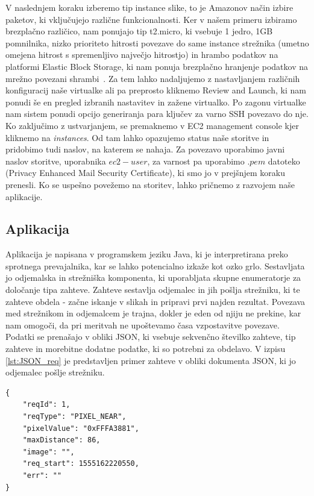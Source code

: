 V naslednjem koraku izberemo tip instance slike, to je Amazonov način izbire paketov, ki vključujejo različne funkcionalnosti. Ker v našem primeru izbiramo brezplačno različico, nam ponujajo tip t2.micro, ki vsebuje 1 jedro, 1GB pomnilnika, nizko prioriteto hitrosti povezave do same instance strežnika (umetno omejena hitrost s spremenljivo največjo hitrostjo) in hrambo podatkov na platformi Elastic Block Storage, ki nam ponuja brezplačno hranjenje podatkov na mrežno povezani shrambi~\cite{1_aws_amazon_ebs}. Za tem lahko nadaljujemo z nastavljanjem različnih konfiguracij naše virtualke ali pa preprosto kliknemo Review and Launch, ki nam ponudi še en pregled izbranih nastavitev in zažene virtualko. Po zagonu virtualke nam sistem ponudi opcijo generiranja para ključev za varno SSH povezavo do nje. Ko zaključimo z ustvarjanjem, se premaknemo v EC2 management console kjer kliknemo na \emph{instances}. Od tam lahko opazujemo status naše storitve in pridobimo tudi naslov, na katerem se nahaja. Za povezavo uporabimo javni naslov storitve, uporabnika $ec2-user$, za varnost pa uporabimo $.pem$ datoteko (Privacy Enhanced Mail Security Certificate), ki smo jo v prejšnjem koraku prenesli. Ko se uspešno povežemo na storitev, lahko pričnemo z razvojem naše aplikacije.

\subsection{Aplikacija}

Aplikacija je napisana v programskem jeziku Java, ki je interpretirana preko sprotnega prevajalnika, kar se lahko potencialno izkaže kot ozko grlo. Sestavljata jo odjemalska in strežniška komponenta, ki uporabljata skupne enumeratorje za določanje tipa zahteve. Zahteve sestavlja odjemalec in jih pošlja strežniku, ki te zahteve obdela - začne iskanje v slikah in pripravi prvi najden rezultat. Povezava med strežnikom in odjemalcem je trajna, dokler je eden od njiju ne prekine, kar nam omogoči, da pri meritvah ne upoštevamo časa vzpostavitve povezave. Podatki se prenašajo v obliki JSON, ki vsebuje sekvenčno številko zahteve, tip zahteve in morebitne dodatne podatke, ki so potrebni za obdelavo. V izpisu \ref{lst:JSON_req} je predstavljen primer zahteve v obliki dokumenta JSON, ki jo odjemalec pošlje strežniku.

\begin{lstlisting}[caption={Primer JSON zahteve.},label={lst:JSON_req}]
{
	"reqId": 1,
	"reqType": "PIXEL_NEAR",
	"pixelValue": "0xFFFA3881",
	"maxDistance": 86,
	"image": "",
	"req_start": 1555162220550,
	"err": ""
}
\end{lstlisting}

